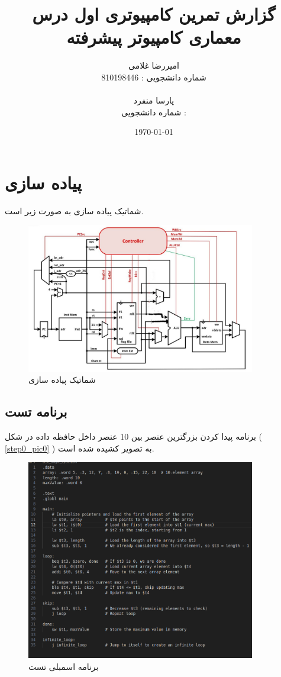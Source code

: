 \documentclass[11pt, a4paper]{article}
\title{گزارش تمرین کامپیوتری اول درس معماری کامپیوتر پیشرفته}
\author{ امیررضا غلامی\mm \\
	شماره دانشجویی : 810198446 \\
	\\
	پارسا منفرد \\
	شماره دانشجویی :
}
\date{\today}
\begin{document}
	\maketitle
	\vspace{15cm}
	\tableofcontents
	
	\pagebreak


	\section{پیاده سازی 
		}
		شماتیک پیاده سازی 
		به صورت زیر است.
		\begin{figure}[H]
			\begin{center}
				\includegraphics[width=10cm]{Photos/single_cycle.jpg}
			\end{center}
			\caption{شماتیک پیاده سازی 
			}
			\label{single_cycle}
		\end{figure}
	

		
	\subsection{برنامه تست}
	برنامه پیدا کردن بزرگترین عنصر بین 10 عنصر داخل حافظه داده در شکل (
	\ref{step0_pic0}
	)
	به تصویر کشیده شده است. 
	\begin{figure}[H]
		\begin{center}
			\includegraphics[width=10cm]{Photos/1.png}
		\end{center}
		\caption{برنامه اسمبلی تست}
		\label{test_asm}
	\end{figure}
	
\end{document}

